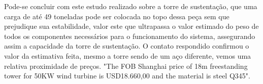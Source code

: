 Pode-se concluir com este estudo realizado sobre a torre de sustentação, que uma carga de até 49 toneladas pode ser colocada no topo dessa peça sem que prejudique sua estabilidade, valor este que ultrapassa o valor estimado do peso de todos os componentes necessários para o funcionamento do sistema, assegurando assim a capacidade da torre de sustentação. O contato respondido confirmou o valor da estimativa feita, mesmo a torre sendo de um aço diferente, vemos uma relativa proximidade de preços. "The FOB Shanghai price of 18m freestanding tower for 50KW wind turbine is USD18.660,00 and the material is steel Q345".